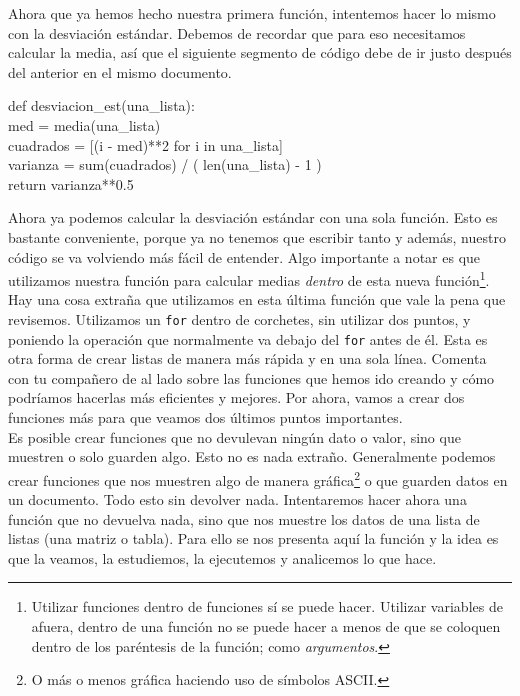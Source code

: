 \documentclass[10pt,letterpaper]{article}
\newcommand{\inlinecode}[1]{
\colorbox{light-gray}{\texttt{#1}}
}
\newenvironment{Code}
{
\begin{lrbox}{\selvestebox}%
\begin{minipage}{\dimexpr\columnwidth-2\fboxsep\relax}
\fontfamily{\ttdefault}\selectfont
}
{\end{minipage}\end{lrbox}%
\begin{center}
\colorbox{light-gray}{\usebox{\selvestebox}}
\end{center}
}
\begin{document}
Ahora que ya hemos hecho nuestra primera funci\'on, intentemos hacer lo mismo con la desviaci\'on est\'andar. Debemos de recordar que para eso necesitamos calcular la media, as\'i que el siguiente segmento de c\'odigo debe de ir justo despu\'es del anterior en el mismo documento.

\begin{Code}
def desviacion\_est(una\_lista):\\
\hspace*{4mm} med = media(una\_lista)\\
\hspace*{4mm} cuadrados = [(i - med)**2 for i in una\_lista]\\
\hspace*{4mm} varianza = sum(cuadrados) / ( len(una\_lista) - 1 )\\
\hspace*{4mm} return varianza**0.5
\end{Code}

Ahora ya podemos calcular la desviaci\'on est\'andar con una sola funci\'on. Esto es bastante conveniente, porque ya no tenemos que escribir tanto y adem\'as, nuestro c\'odigo se va volviendo m\'as f\'acil de entender. Algo importante a notar es que utilizamos nuestra funci\'on para calcular medias \emph{dentro} de esta nueva funci\'on\footnote{Utilizar funciones dentro de funciones s\'i se puede hacer. Utilizar variables de afuera, dentro de una funci\'on no se puede hacer a menos de que se coloquen dentro de los par\'entesis de la funci\'on; como \textit{argumentos}.}. Hay una cosa extra\~na que utilizamos en esta \'ultima funci\'on que vale la pena que revisemos. Utilizamos un \inlinecode{for} dentro de corchetes, sin utilizar dos puntos, y poniendo la operaci\'on que normalmente va debajo del \inlinecode{for} antes de \'el. Esta es otra forma de crear listas de manera m\'as r\'apida y en una sola l\'inea. Comenta con tu compa\~nero de al lado sobre las funciones que hemos ido creando y c\'omo podr\'iamos hacerlas m\'as eficientes y mejores. Por ahora, vamos a crear dos funciones m\'as para que veamos dos \'ultimos puntos importantes.\\

Es posible crear funciones que no devulevan ning\'un dato o valor, sino que muestren o solo guarden algo. Esto no es nada extra\~no. Generalmente podemos crear funciones que nos muestren algo de manera gr\'afica\footnote{O m\'as o menos gr\'afica haciendo uso de s\'imbolos ASCII.} o que guarden datos en un documento. Todo esto sin devolver nada. Intentaremos hacer ahora una funci\'on que no devuelva nada, sino que nos muestre los datos de una lista de listas (una matriz o tabla). Para ello se nos presenta aqu\'i la funci\'on y la idea es que la veamos, la estudiemos, la ejecutemos y analicemos lo que hace.
\end{document}
